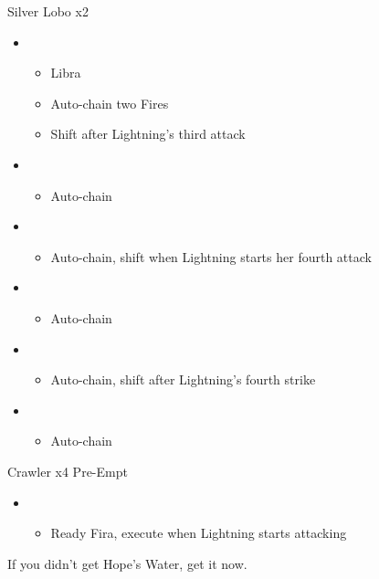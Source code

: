 \begin{multicols}{2}
\begin{battle}{Silver Lobo x2}
\begin{itemize}
    \item \first
    \begin{itemize}
        \item Libra
        \item Auto-chain two Fires
        \item Shift after Lightning's third attack
    \end{itemize}
    \item \fourth
    \begin{itemize}
        \item Auto-chain
    \end{itemize}
    \item \sixth
    \begin{itemize}
        \item Auto-chain, shift when Lightning starts her fourth attack
    \end{itemize}
    \item \first
    \begin{itemize}
        \item Auto-chain
    \end{itemize}
    \item \fourth
    \begin{itemize}
        \item Auto-chain, shift after Lightning's fourth strike
    \end{itemize}
    \item \sixth
    \begin{itemize}
        \item Auto-chain
    \end{itemize}
\end{itemize}
\end{battle}

\begin{battle}{Crawler x4 Pre-Empt}
\begin{itemize}
    \item \first
    \begin{itemize}
        \item Ready Fira, execute when Lightning starts attacking
    \end{itemize}
\end{itemize}
\end{battle}
If you didn't get Hope's Water, get it now.


\end{multicols}

